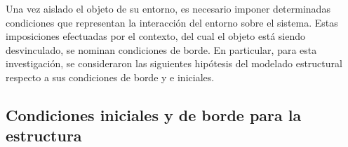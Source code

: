 Una vez aislado el objeto de su entorno, es necesario imponer determinadas condiciones que representan la interacción del entorno sobre el sistema. Estas imposiciones efectuadas por el contexto, del cual el objeto está siendo desvinculado, se nominan condiciones de borde. En particular, para esta investigación, se consideraron las siguientes hipótesis del modelado estructural respecto a sus condiciones de borde y e iniciales.


\subsection{Condiciones iniciales y de borde para la estructura}\label{Sec:MET:ModeladoEstructural}
